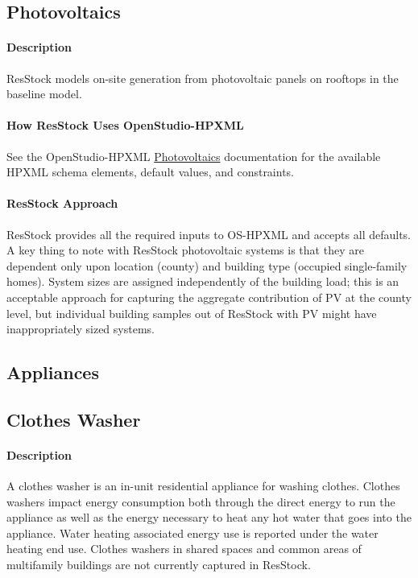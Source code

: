 \subsection{Photovoltaics}
 
\paragraph{Description}

ResStock models on-site generation from photovoltaic panels on rooftops in the baseline model.

\paragraph{How ResStock Uses OpenStudio-HPXML}
See the OpenStudio-HPXML \href{https://openstudio-hpxml.readthedocs.io/en/v1.8.1/workflow_inputs.html#hpxml-photovoltaics}{Photovoltaics} documentation for the available HPXML schema elements, default values, and constraints. 

\paragraph{ResStock Approach}

ResStock provides all the required inputs to OS-HPXML and accepts all defaults. A key thing to note with ResStock photovoltaic systems is that they are dependent only upon location (county) and building type (occupied single-family homes). System sizes are assigned independently of the building load; this is an acceptable approach for capturing the aggregate contribution of PV at the county level, but individual building samples out of ResStock with PV might have inappropriately sized systems. 

\subsection{Appliances}


\subsection{Clothes Washer}

\paragraph{Description}

A clothes washer is an in-unit residential appliance for washing clothes. Clothes washers impact energy consumption both through the direct energy to run the appliance as well as the energy necessary to heat any hot water that goes into the appliance. Water heating associated energy use is reported under the water heating end use. Clothes washers in shared spaces and common areas of multifamily buildings are not currently captured in ResStock.

